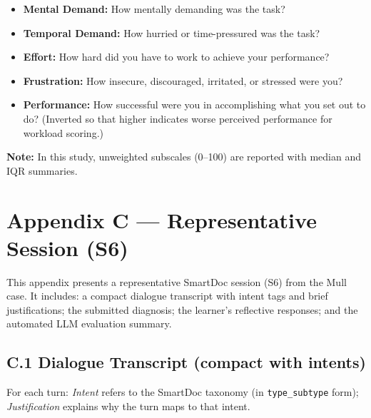 \begin{itemize}
  \item \textbf{Mental Demand:} How mentally demanding was the task?
  \item \textbf{Temporal Demand:} How hurried or time-pressured was the task?
  \item \textbf{Effort:} How hard did you have to work to achieve your performance?
  \item \textbf{Frustration:} How insecure, discouraged, irritated, or stressed were you?
  \item \textbf{Performance:} How successful were you in accomplishing what you set out to
  do? (Inverted so that higher indicates worse perceived performance for workload scoring.)
\end{itemize}

\noindent
\textbf{Note:}  
In this study, unweighted subscales (0–100) are reported with median and IQR summaries.

\chapter*{Appendix C — Representative Session (S6)}
\label{app:session_s6}

\noindent
This appendix presents a representative SmartDoc session (S6) from the Mull case. It includes: a compact dialogue transcript with intent tags and brief justifications; the submitted diagnosis; the learner's reflective responses; and the automated LLM evaluation summary.

\section*{C.1 \quad Dialogue Transcript (compact with intents)}
\label{app:session_s6:transcript}

\noindent
For each turn: \emph{Intent} refers to the SmartDoc taxonomy (in \texttt{type\_subtype} form); \emph{Justification} explains why the turn maps to that intent.

